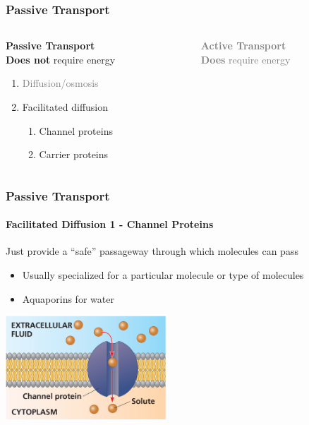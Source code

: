 \documentclass[10pt]{beamer}
\begin{document}
\begin{frame}[t]
\frametitle{Passive Transport}
\vspace{1.0cm}

	\begin{columns}[t]
		\begin{column}{0.5\textwidth}
			\Large{\textbf{\textcolor{myblue2}{Passive Transport}}}\normalsize{}\\
			\medskip
			\textbf{Does not} require energy\\
				\begin{enumerate}
					\item \textcolor{gray}{Diffusion/osmosis}
					\item Facilitated diffusion
						\begin{enumerate}
							\item Channel proteins
							\item Carrier proteins
						\end{enumerate}
				\end{enumerate}
		\end{column}
		
		\begin{column}{0.5\textwidth}
			\Large{\textbf{\textcolor{gray}{Active Transport}}}\normalsize{}\\
			\medskip
			\textcolor{gray}{\textbf{Does} require energy}\\
		\end{column}
	\end{columns}
\end{frame}


\begin{frame}[t]
\frametitle{Passive Transport}
\framesubtitle{Facilitated Diffusion 1 - Channel Proteins}
\vspace{0.5cm}

	Just provide a ``safe'' passageway through which molecules can pass
		\begin{itemize}
			\item Usually specialized for a particular molecule or type of molecules
			\item \textcolor{myblue}{Aquaporins} for water
		\end{itemize}

	\vspace{0.5cm}
	
	\begin{center}
		\includegraphics[width=0.45\textwidth]{figures/fg07_14a.jpg}
	\end{center}
\end{frame}
\end{document}
